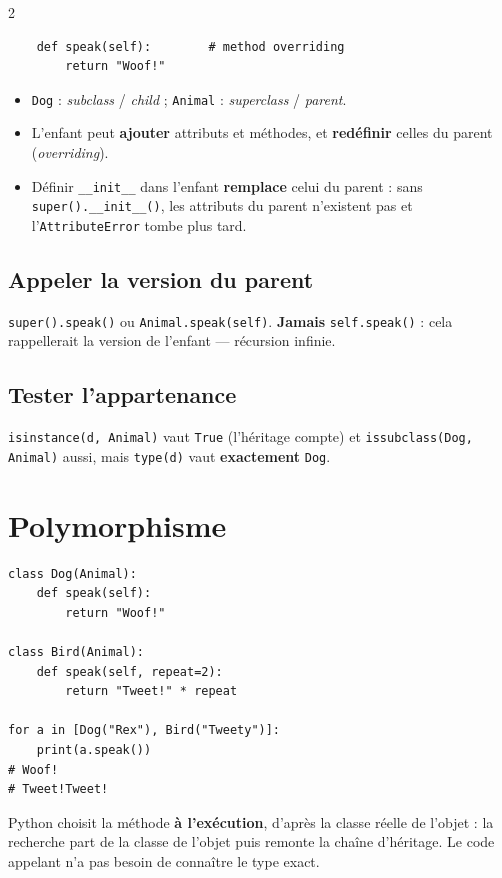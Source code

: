 \documentclass[a4paper,10pt]{article}
\newcommand{\co}[1]{\texttt{\textcolor{codefg}{#1}}}
\begin{document}
\begin{multicols}{2}
\begin{lstlisting}
    def speak(self):        # method overriding
        return "Woof!"
\end{lstlisting}

\begin{itemize}
  \item \co{Dog} : \emph{subclass} / \emph{child} ; \co{Animal} :
        \emph{superclass} / \emph{parent}.
  \item L'enfant peut \textbf{ajouter} attributs et méthodes, et
        \textbf{redéfinir} celles du parent (\emph{overriding}).
  \item Définir \co{\_\_init\_\_} dans l'enfant \textbf{remplace} celui du
        parent : sans \co{super().\_\_init\_\_()}, les attributs du parent
        n'existent pas et l'\co{AttributeError} tombe plus tard.
\end{itemize}

\subsection{Appeler la version du parent}
\co{super().speak()} ou \co{Animal.speak(self)}. \textbf{Jamais}
\co{self.speak()} : cela rappellerait la version de l'enfant --- récursion
infinie.

\subsection{Tester l'appartenance}
\co{isinstance(d, Animal)} vaut \co{True} (l'héritage compte) et
\co{issubclass(Dog, Animal)} aussi, mais \co{type(d)} vaut
\textbf{exactement} \co{Dog}.

\section{Polymorphisme}

\begin{lstlisting}
class Dog(Animal):
    def speak(self):
        return "Woof!"

class Bird(Animal):
    def speak(self, repeat=2):
        return "Tweet!" * repeat

for a in [Dog("Rex"), Bird("Tweety")]:
    print(a.speak())
# Woof!
# Tweet!Tweet!
\end{lstlisting}

Python choisit la méthode \textbf{à l'exécution}, d'après la classe réelle
de l'objet : la recherche part de la classe de l'objet puis remonte la
chaîne d'héritage. Le code appelant n'a pas besoin de connaître le type
exact.


\end{multicols}
\end{document}
